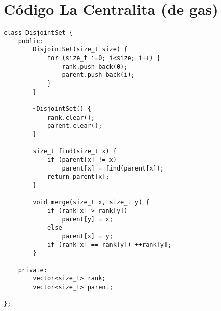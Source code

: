 \newpage
\section{Código La Centralita (de gas)} \label{App:AppendixB}

\begin{frame}

\begin{lstlisting}
class DisjointSet {
	public:
		DisjointSet(size_t size) {
			for (size_t i=0; i<size; i++) {
				rank.push_back(0);
				parent.push_back(i);
			}
		}

		~DisjointSet() {
			rank.clear();
			parent.clear();
		}

		size_t find(size_t x) {
			if (parent[x] != x)
				parent[x] = find(parent[x]);
			return parent[x];
		}

		void merge(size_t x, size_t y) {
			if (rank[x] > rank[y])
				parent[y] = x;
			else
				parent[x] = y;
			if (rank[x] == rank[y]) ++rank[y];
		}

	private:
		vector<size_t> rank;
		vector<size_t> parent;

};
\end{lstlisting}
\end{frame}

\newpage
